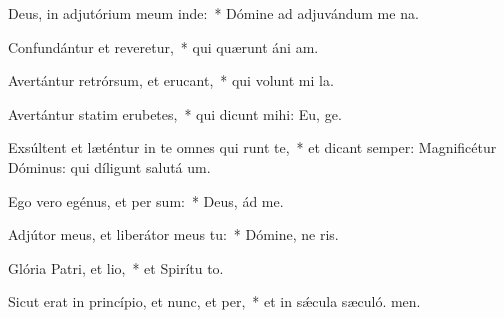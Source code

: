 \item Deus, in adjutórium meum inde:~* Dómine ad adjuvándum me na.
\item Confundántur et reveretur,~* qui quærunt áni am.
\item Avertántur retrórsum, et erucant,~* qui volunt mi la.
\item Avertántur statim erubetes,~* qui dicunt mihi: Eu, ge.
\item Exsúltent et læténtur in te omnes qui runt te,~* et dicant semper: Magnificétur Dóminus: qui díligunt salutá um.
\item Ego vero egénus, et per sum:~* Deus, ád me.
\item Adjútor meus, et liberátor meus  tu:~* Dómine, ne ris.
\item Glória Patri, et lio,~* et Spirítu to.
\item Sicut erat in princípio, et nunc, et per,~* et in sǽcula sæculó. men.
